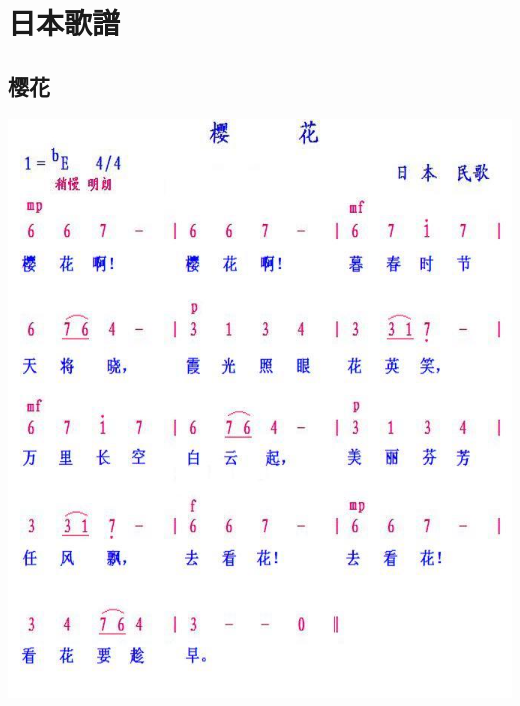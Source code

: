 \documentclass[cn,pad,twocol]{elegantbook}
\begin{document}
  
\chapter{日本歌譜}
\section{樱花}      \includegraphics[width=\textwidth]{dongxiao/日本-樱花.jpg}  
\end{document}
